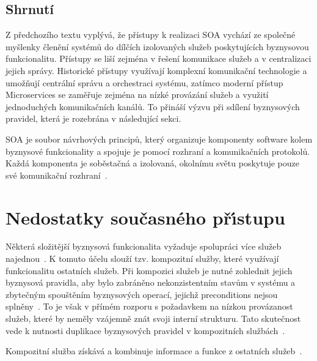 \subsection{Shrnutí}

Z předchozího textu vyplývá, že přístupy k realizaci \gls{SOA} vychází ze společné
myšlenky členění systémů do dílčích izolovaných služeb poskytujících byznysovou funkcionalitu.
Přístupy se liší zejména v řešení komunikace služeb a v centralizaci jejich správy.
Historické přístupy využívají komplexní komunikační technologie a umožňují centrální
správu a orchestraci systému, zatímco moderní přístup Microservices se zaměřuje zejména
na nízké provázání služeb a využití jednoduchých komunikačních kanálů.
To přináší výzvu při sdílení byznysových pravidel, která je rozebrána v následující sekci.

\begin{definition}
    \gls{SOA} je soubor návrhových principů, který organizuje komponenty software
    kolem byznysové funkcionality a spojuje je pomocí rozhraní a komunikačních protokolů.
    Každá komponenta je soběstačná a izolovaná, okolnímu světu poskytuje pouze
    své komunikační rozhraní~\cite{lewis2014microservices, papazoglou2003service}.
\end{definition}

\section{Nedostatky současného př\'{\i}stupu}\label{sec:shortcomings}

Některá složitější byznysová funkcionalita vyžaduje spolupráci více služeb
najednou~\cite{papazoglou2003service}. K tomuto účelu slouží tzv. kompozitní
služby, které využívají funkcionalitu ostatních služeb. Při kompozici služeb je nutné
zohlednit jejich byznysová pravidla, aby bylo zabráněno nekonzistentním stavům v systému
a zbytečným spouštěním byznysových operací, jejichž preconditions nejsou
splněny~\cite{cerny2017disambiguation}. To je však v přímém rozporu s požadavkem na nízkou
provázanost služeb, které by neměly vzájemně znát svoji interní strukturu. Tato skutečnost
vede k nutnosti duplikace byznysových pravidel v kompozitních službách~\cite{cerny2016survey}.

\begin{definition}
    Kompozitní služba získává a kombinuje informace a funkce z ostatních služeb~\cite{papazoglou2003service}.
\end{definition}

